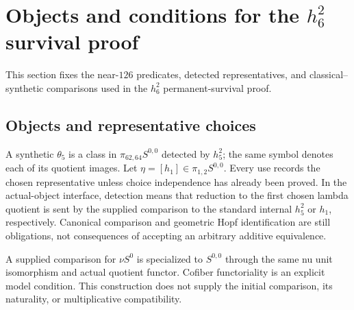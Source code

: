 \section{Objects and conditions for the $h_6^2$ survival proof}
\label{chap:kervaire-setup}

This section fixes the near-$126$ predicates, detected representatives, and
classical--synthetic comparisons used in the $h_6^2$ permanent-survival proof.

\subsection{Objects and representative choices}

\begin{definition}
  \label{def:synthetic-theta5-choice}
  \leanok
  A synthetic $\theta_5$ is a class in
  $\pi_{62,64}S^{0,0}$ detected by $h_5^2$; the same symbol denotes each of its
  quotient images.  Let $\eta=[h_1]\in\pi_{1,2}S^{0,0}$.  Every use records
  the chosen representative unless choice independence has already been
  proved. In the actual-object interface, detection means that reduction to
  the first chosen lambda quotient is sent by the supplied comparison to the
  standard internal $h_5^2$ or $h_1$, respectively. Canonical comparison and
  geometric Hopf identification are still obligations, not consequences of
  accepting an arbitrary additive equivalence.
\end{definition}

\begin{definition}
  \label{def:actual-sphere-first-quotient}
  \leanok
  A supplied comparison for $\nu S^0$ is specialized to $S^{0,0}$ through the
  same nu unit isomorphism and actual quotient functor. Cofiber functoriality
  is an explicit model condition. This construction does not supply the
  initial comparison, its naturality, or multiplicative compatibility.
\end{definition}

